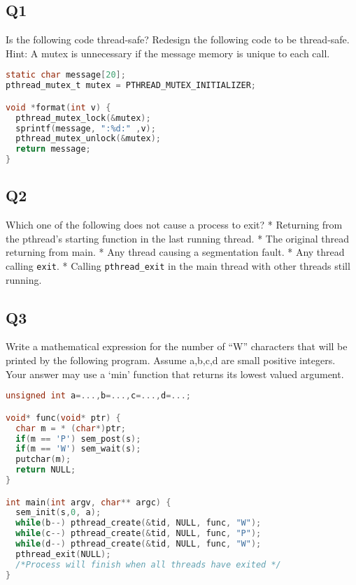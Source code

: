 \subsection{Q1}\label{q1}

Is the following code thread-safe? Redesign the following code to be thread-safe. Hint: A mutex is unnecessary if the message memory is unique to each call.

\begin{lstlisting}[language=C]
static char message[20];
pthread_mutex_t mutex = PTHREAD_MUTEX_INITIALIZER;

void *format(int v) {
  pthread_mutex_lock(&mutex);
  sprintf(message, ":%d:" ,v);
  pthread_mutex_unlock(&mutex);
  return message;
}
\end{lstlisting}

\subsection{Q2}\label{q2}

Which one of the following does not cause a process to exit? * Returning from the pthread's starting function in the last running thread. * The original thread returning from main. * Any thread causing a segmentation fault. * Any thread calling \texttt{exit}. * Calling \texttt{pthread\_exit} in the main thread with other threads still running.

\subsection{Q3}\label{q3}

Write a mathematical expression for the number of ``W'' characters that will be printed by the following program. Assume a,b,c,d are small positive integers. Your answer may use a `min' function that returns its lowest valued argument.

\begin{lstlisting}[language=C]
unsigned int a=...,b=...,c=...,d=...;

void* func(void* ptr) {
  char m = * (char*)ptr;
  if(m == 'P') sem_post(s);
  if(m == 'W') sem_wait(s);
  putchar(m);
  return NULL;
}

int main(int argv, char** argc) {
  sem_init(s,0, a);
  while(b--) pthread_create(&tid, NULL, func, "W"); 
  while(c--) pthread_create(&tid, NULL, func, "P"); 
  while(d--) pthread_create(&tid, NULL, func, "W"); 
  pthread_exit(NULL); 
  /*Process will finish when all threads have exited */
}
\end{lstlisting}

